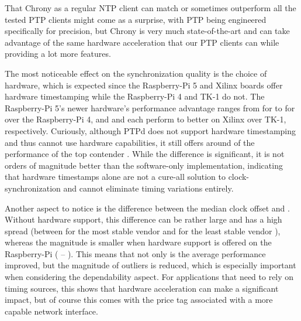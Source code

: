 %
That Chrony as a regular NTP client can match or sometimes outperform all the tested PTP clients might come as a surprise, with PTP being engineered specifically for precision, but Chrony is very much state-of-the-art and can take advantage of the same hardware acceleration that our PTP clients can while providing a lot more features.


The most noticeable effect on the synchronization quality is the choice of hardware, which is expected since the Raspberry-Pi 5 and Xilinx boards offer hardware timestamping while the Raspberry-Pi 4 and TK-1 do not. The Raspberry-Pi 5's newer hardware's performance advantage ranges from \fRatio{\cmpMin} for \fVendor{\cmpMinArg} to \fRatio{\cmpMax} for \fVendor{\cmpMaxArg} over the Raspberry-Pi 4, and \fVendor{\cmpMinArg} and \fVendor{\cmpMaxArg} each perform \fRatio{\cmpMin} to \fRatio{\cmpMax} better on Xilinx over TK-1, respectively. Curiously, although PTPd does not support hardware timestamping and thus cannot use hardware capabilities, it still offers around  of the performance of the top contender . While the difference is significant, it is not orders of magnitude better than the software-only implementation, indicating that hardware timestamps alone are not a cure-all solution to clock-synchronization and cannot eliminate timing variations entirely.


%
Another aspect to notice is the difference between the median clock offset and \PNineFive{}. Without hardware support, this difference can be rather large and has a high spread (between \fRatio{\cmpMin} for the most stable vendor \fVendor{\cmpMinArg} and \fRatio{\cmpMax} for the least stable vendor \fVendor{\cmpMaxArg}),
whereas the magnitude is smaller when hardware support is offered on the Raspberry-Pi %
%
(\fRatio[1]{\cmpMin} \fVendor{\cmpMinArg} -- \fRatio[1]{\cmpMax} \fVendor{\cmpMaxArg}).
This means that not only is the average performance improved, but the magnitude of outliers is reduced, which is especially important when considering the dependability aspect. For applications that need to rely on timing sources, this shows that hardware acceleration can make a significant impact, but of course this comes with the price tag associated with a more capable network interface.

